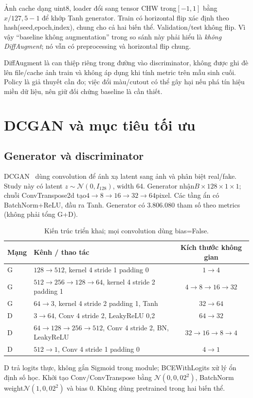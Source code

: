 \documentclass[11pt,a4paper]{article}
\begin{document}
Ảnh cache dạng uint8, loader đổi sang tensor CHW trong$[-1,1]$ bằng $x/127{,}5-1$ để khớp Tanh generator. Train có horizontal flip xác định theo hash(seed,epoch,index), chung cho cả hai biến thể. Validation/test không flip. Vì vậy ``baseline không augmentation'' trong so sánh này phải hiểu là \emph{không DiffAugment}; nó vẫn có preprocessing và horizontal flip chung.

DiffAugment là can thiệp riêng trong đường vào discriminator, không được ghi đè lên file/cache ảnh train và không áp dụng khi tính metric trên mẫu sinh cuối. Policy là giả thuyết cần đo; việc đổi màu/cutout có thể gây hại nếu phá tín hiệu miền dữ liệu, nên giữ đối chứng baseline là cần thiết.
\clearpage

\section{DCGAN và mục tiêu tối ưu}\label{sec:model}
\subsection{Generator và discriminator}
DCGAN~\cite{dcgan} dùng convolution để ánh xạ latent sang ảnh và phân biệt real/fake. Study này có latent $z\sim\mathcal N(0,I_{128})$, width 64. Generator nhận$B\times 128\times 1\times 1$; chuỗi ConvTranspose2d tạo$4\to 8\to 16\to 32\to 64$pixel. Các tầng ẩn có BatchNorm+ReLU, đầu ra Tanh. Generator có 3.806.080 tham số theo metrics (không phải tổng G+D).

\begin{table}[htbp]\centering\small\caption{Kiến trúc triển khai; mọi convolution dùng bias=False.}
\begin{tabular}{llc}\toprule Mạng & Kênh / thao tác & Kích thước không gian\\\midrule
G & $128\to 512$, kernel 4 stride 1 padding 0 & $1\to 4$\\
G & $512\to 256\to 128\to 64$, kernel 4 stride 2 padding 1 & $4\to 8\to 16\to 32$\\
G & $64\to 3$, kernel 4 stride 2 padding 1, Tanh & $32\to 64$\\\midrule
D & $3\to 64$, Conv 4 stride 2, LeakyReLU 0,2 & $64\to 32$\\
D & $64\to 128\to 256\to 512$, Conv 4 stride 2, BN, LeakyReLU & $32\to 16\to 8\to 4$\\
D & $512\to 1$, Conv 4 stride 1 padding 0 & $4\to 1$\\\bottomrule\end{tabular}\end{table}
D trả logits thực, không gắn Sigmoid trong module; BCEWithLogits xử lý ổn định số học. Khởi tạo Conv/ConvTranspose bằng $\mathcal N(0,0{,}02^2)$, BatchNorm weight$\mathcal N(1,0{,}02^2)$ và bias 0. Không dùng pretrained trong hai biến thể.
\end{document}
